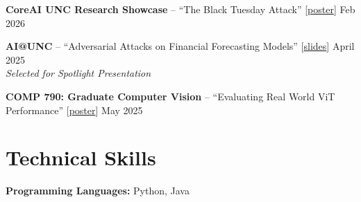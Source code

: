 \documentclass[11pt,letterpaper]{article}
\newcommand{\dates}[1]{\hfill #1}
\begin{document}
\textbf{CoreAI UNC Research Showcase} -- ``The Black Tuesday Attack'' [\href{https://drive.google.com/file/d/1dxe09yK2t-jKYxDvMgamqlDRq_Eh0SYO/view?usp=sharing}{poster}]
 \dates{Feb 2026}

\textbf{AI@UNC} -- ``Adversarial Attacks on Financial Forecasting Models'' [\href{https://drive.google.com/file/d/1wtKcK2hbIyacfg8mf0JP0TJNtrU2I4Q9/view?usp=sharing}{slides}]
 \dates{April 2025}\\
\textit{Selected for Spotlight Presentation}

\textbf{COMP 790: Graduate Computer Vision} -- ``Evaluating Real World ViT Performance''
[\href{https://drive.google.com/file/d/1pDFAlfCgygF0m94B9xhhYrKzUEZAEjkT/view?usp=sharing}{poster}]
 \dates{May 2025}

\section{Technical Skills}

\textbf{Programming Languages:} Python, Java
\end{document}
